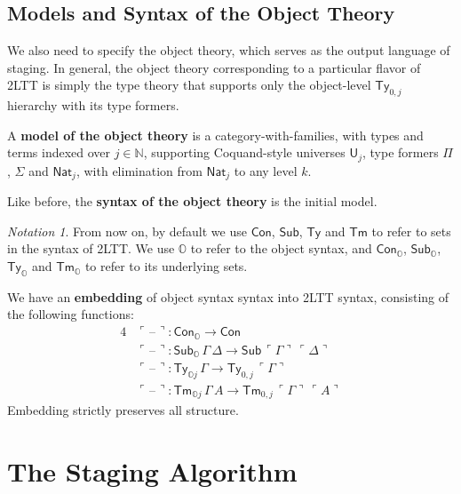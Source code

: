 \documentclass[acmsmall]{acmart}
\newcommand{\msf}[1]{\mathsf{#1}}
\newcommand{\mbb}[1]{\mathbb{#1}}
\newcommand{\mbbo}{\mbb{O}}
\newcommand{\ob}{_\mbbo}
\renewcommand{\U}{\msf{U}}
\newcommand{\Con}{\msf{Con}}
\newcommand{\Sub}{\msf{Sub}}
\newcommand{\Ty}{\msf{Ty}}
\newcommand{\Tm}{\msf{Tm}}
\newcommand{\Nat}{\msf{Nat}}
\newcommand{\blank}{{\mathord{\hspace{1pt}\text{--}\hspace{1pt}}}}
\newcommand{\emb}[1]{\ulcorner#1\urcorner}
\theoremstyle{remark}
\newtheorem{notation}{Notation}
\begin{document}
\subsection{Models and Syntax of the Object Theory}

We also need to specify the object theory, which serves as the output language
of staging. In general, the object theory corresponding to a particular flavor
of 2LTT is simply the type theory that supports only the object-level $\Ty_{0,j}$
hierarchy with its type formers.

\begin{definition}
A \textbf{model of the object theory} is a category-with-families, with types and
terms indexed over $j \in \mbb{N}$, supporting Coquand-style universes $\U_j$,
type formers $\Pi$, $\Sigma$ and $\Nat_j$, with elimination from $\Nat_j$ to
any level $k$.
\end{definition}

\begin{definition}
Like before, the \textbf{syntax of the object theory} is the initial model.
\end{definition}

\begin{notation}
From now on, by default we use $\Con$, $\Sub$, $\Ty$ and $\Tm$ to refer to sets
in the syntax of 2LTT. We use $\mbbo$ to refer to the object syntax, and
$\Con\ob$, $\Sub\ob$, $\Ty\ob$ and $\Tm\ob$ to refer to its underlying sets.
\end{notation}

\begin{definition}
We have an \textbf{embedding} of object syntax syntax into 2LTT syntax, consisting
of the following functions:
\begin{alignat*}{4}
  & \emb{\blank} : \Con\ob \to \Con\\
  & \emb{\blank} : \Sub\ob\,\Gamma\,\Delta \to \Sub\,\emb{\Gamma}\,\emb{\Delta}\\
  & \emb{\blank} : \Ty_{\mbbo j}\,\Gamma \to \Ty_{0,j}\,\emb{\Gamma}\\
  & \emb{\blank} : \Tm_{\mbbo j}\,\Gamma\,A \to \Tm_{0,j}\,\emb{\Gamma}\,\emb{A}
\end{alignat*}
Embedding strictly preserves all structure.
\end{definition}

\section{The Staging Algorithm}\label{sec:staging-algorithm}
\end{document}

